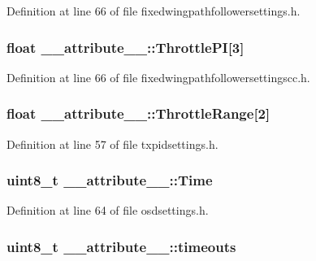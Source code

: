 \-Definition at line 66 of file fixedwingpathfollowersettings.\-h.

\hypertarget{struct____attribute_____afd75482c2ab017a5118bd7ed8fd3eac1}{
\subsubsection[{\-Throttle\-P\-I}]{\setlength{\rightskip}{0pt plus 5cm}float {\bf \-\_\-\-\_\-attribute\-\_\-\-\_\-\-::\-Throttle\-P\-I}\mbox{[}3\mbox{]}}}\label{struct____attribute_____afd75482c2ab017a5118bd7ed8fd3eac1}


\-Definition at line 66 of file fixedwingpathfollowersettingscc.\-h.

\hypertarget{struct____attribute_____a72af498610504641e65b39b87cdcc3cf}{
\subsubsection[{\-Throttle\-Range}]{\setlength{\rightskip}{0pt plus 5cm}float {\bf \-\_\-\-\_\-attribute\-\_\-\-\_\-\-::\-Throttle\-Range}\mbox{[}2\mbox{]}}}\label{struct____attribute_____a72af498610504641e65b39b87cdcc3cf}


\-Definition at line 57 of file txpidsettings.\-h.

\hypertarget{struct____attribute_____a6d35c2c8328f1df2fa7e5c95e8a4551c}{
\subsubsection[{\-Time}]{\setlength{\rightskip}{0pt plus 5cm}uint8\-\_\-t {\bf \-\_\-\-\_\-attribute\-\_\-\-\_\-\-::\-Time}}}\label{struct____attribute_____a6d35c2c8328f1df2fa7e5c95e8a4551c}


\-Definition at line 64 of file osdsettings.\-h.

\hypertarget{struct____attribute_____ad79d9d78415e451903a0e941fa8ae309}{
\subsubsection[{timeouts}]{\setlength{\rightskip}{0pt plus 5cm}uint8\-\_\-t {\bf \-\_\-\-\_\-attribute\-\_\-\-\_\-\-::timeouts}}}\label{struct____attribute_____ad79d9d78415e451903a0e941fa8ae309}


